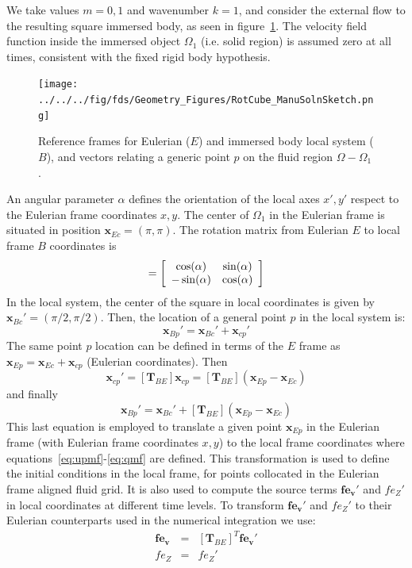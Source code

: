 \documentclass[11pt]{book}
\begin{document}
We take values $m=0,1$ and wavenumber $k=1$, and consider the external flow to the resulting square immersed body, as seen in figure~\ref{Fig:ManuSoln}. The velocity field function inside the immersed object $\Omega_1$ (i.e. solid region) is assumed zero at all times, consistent with the fixed rigid body hypothesis.
%
\begin{figure}[h]
      \centering
      \texttt{[image: ../../../fig/fds/Geometry\_Figures/RotCube\_ManuSolnSketch.png]}
      \caption[Reference frame for a rotated immersed body]{Reference frames for Eulerian ($E$) and immersed body local system ($B$), and vectors relating a generic point $p$ on the fluid region $\Omega-\Omega_1$.}
    \label{Fig:ManuSoln}
\end{figure}
%
An angular parameter $\alpha$ defines the orientation of the local axes $x',y'$ respect to the Eulerian frame coordinates $x,y$. The center of $\Omega_1$ in the Eulerian frame is situated in position $\mathbf{x}_{Ec}=(\pi,\pi)$. The rotation matrix from Eulerian $E$ to local frame $B$ coordinates is
%
\begin{equation}
  [\mathbf{T}_{BE}] = \left[ \begin{array}{c c}
                                          \cos(\alpha) & \sin(\alpha) \\
                                         -\sin(\alpha)  & \cos(\alpha) \end{array} \right]
\end{equation}
%
In the local system, the center of the square in local coordinates is given by $\mathbf{x}_{Bc}'=(\pi/2,\pi/2)$. Then, the location of a general point $p$ in the local system is:
%
\begin{equation}
    \mathbf{x}_{Bp}'= \mathbf{x}_{Bc}' +\mathbf{x}_{cp}'
\end{equation}
%
The same point $p$ location can be defined in terms of the $E$ frame as $\mathbf{x}_{Ep}= \mathbf{x}_{Ec} +\mathbf{x}_{cp}$ (Eulerian coordinates). Then
%
\begin{equation}
    \mathbf{x}_{cp}'=[\mathbf{T}_{BE}] \mathbf{x}_{cp}=[\mathbf{T}_{BE}] \left( \mathbf{x}_{Ep} - \mathbf{x}_{Ec} \right)
\end{equation}
%
and finally
%
\begin{equation}
    \mathbf{x}_{Bp}'= \mathbf{x}_{Bc}' +[\mathbf{T}_{BE}] \left( \mathbf{x}_{Ep} - \mathbf{x}_{Ec} \right)
\end{equation}
%
This last equation is employed to translate a given point $\mathbf{x}_{Ep}$ in the Eulerian frame (with Eulerian frame coordinates $x,y$) to the local frame coordinates where equations~\eqref{eq:upmf}-\eqref{eq:qmf} are defined. This transformation is used to define the initial conditions in the local frame, for points collocated in the Eulerian frame aligned fluid grid. It is also used to compute the source terms $\mathbf{fe_v'}$ and $fe_Z'$ in local coordinates at different time levels.
To transform  $\mathbf{fe_v'}$ and $fe_Z'$ to their Eulerian counterparts used in the numerical integration we use:
%
\begin{eqnarray}
  \mathbf{fe_v} &=& [\mathbf{T}_{BE}]^T \mathbf{fe_v'} \\
  fe_Z &=& fe_Z'
\end{eqnarray}
%
\end{document}
